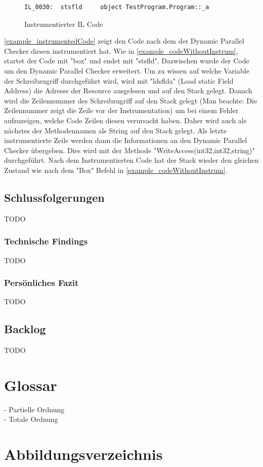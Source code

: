 \documentclass[10pt,a4paper]{article}
\begin{document}
\begin{flushleft}
\begin{figure}[H]
\begin{lstlisting}[language=CIL,backgroundcolor=\color{backcolor}]
IL_0030:  stsfld     object TestProgram.Program::_a
\end{lstlisting}
\caption{Instrumentierter IL Code}\label{example_instrumentedCode}
\end{figure}
\autoref{example_instrumentedCode} zeigt den Code nach dem der Dynamic Parallel Checker diesen instrumentiert hat. Wie in \autoref{example_codeWithoutInstrum}, startet der Code mit "box" und endet mit "stsfld". Dazwischen wurde der Code um den Dynamic Parallel Checker erweitert. Um zu wissen auf welche Variable der Schreibzugriff durchgeführt wird, wird mit "ldsflda" (Load static Field Address) die Adresse der Resource ausgelesen und auf den Stack gelegt. Danach wird die Zeilennummer des Schreibzugriff auf den Stack gelegt (Man beachte: Die Zeilennummer zeigt die Zeile vor der Instrumentation) um bei einem Fehler aufzuzeigen, welche Code Zeilen diesen verursacht haben. Daher wird auch als nächstes der Methodennamen als String auf den Stack gelegt. Als letzte instrumentierte Zeile werden dann die Informationen an den Dynamic Parallel Checker übergeben. Dies wird mit der Methode "WriteAccess(int32,int32,string)" durchgeführt. Nach dem Instrumentierten Code hat der Stack wieder den gleichen Zustand wie nach dem "Box" Befehl in \autoref{example_codeWithoutInstrum}.
\end{flushleft}
\subsection{Schlussfolgerungen}
TODO
\subsubsection{Technische Findings}
TODO
\subsubsection{Persönliches Fazit}
TODO
\subsection{Backlog}
TODO
\section{Glossar}
- Partielle Ordnung\\
- Totale Ordnung
\section{Abbildungsverzeichnis}
\listoffigures
\end{document}
